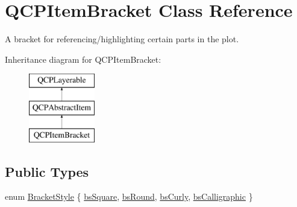 \hypertarget{classQCPItemBracket}{\section{\-Q\-C\-P\-Item\-Bracket \-Class \-Reference}
\label{classQCPItemBracket}
}


\-A bracket for referencing/highlighting certain parts in the plot.  


\-Inheritance diagram for \-Q\-C\-P\-Item\-Bracket\-:\begin{figure}[H]
\begin{center}
\leavevmode
\includegraphics[height=3.000000cm]{classQCPItemBracket}
\end{center}
\end{figure}
\subsection*{\-Public \-Types}
\begin{DoxyCompactItemize}
\item 
enum \hyperlink{classQCPItemBracket_a7ac3afd0b24a607054e7212047d59dbd}{\-Bracket\-Style} \{ \hyperlink{classQCPItemBracket_a7ac3afd0b24a607054e7212047d59dbda7f9df4a7359bfe3dac1dbe4ccf5d220c}{bs\-Square}, 
\hyperlink{classQCPItemBracket_a7ac3afd0b24a607054e7212047d59dbda394627b0830a26ee3e0a02ca67a9f918}{bs\-Round}, 
\hyperlink{classQCPItemBracket_a7ac3afd0b24a607054e7212047d59dbda5024ce4023c2d8de4221f1cd4816acd8}{bs\-Curly}, 
\hyperlink{classQCPItemBracket_a7ac3afd0b24a607054e7212047d59dbda8f29f5ef754e2dc9a9efdedb2face0f3}{bs\-Calligraphic}
 \}
\end{DoxyCompactItemize}
